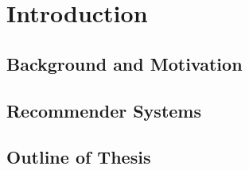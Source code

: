 \section{Introduction} \label{sect:intro}

\subsection{Background and Motivation} \label{subsect:intro:background}
\subsection{Recommender Systems} \label{subsect:intro:recommender-systems}
\subsection{Outline of Thesis} \label{subsect:intro:outline}
